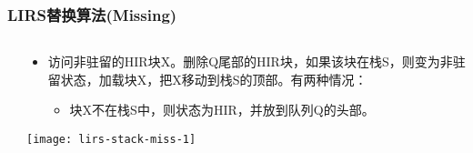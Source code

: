 \begin{frame}[plain]
	\frametitle{LIRS替换算法(Missing)}
	\begin{columns}
		\begin{column}{.1\textwidth}
			\centering
			
			
		\end{column}
		
		\begin{column}{.9\textwidth}
			
			\begin{itemize}
				
				\item 访问非驻留的HIR块X。删除Q尾部的HIR块，如果该块在栈S，则变为非驻留状态，加载块X，把X移动到栈S的顶部。有两种情况：
				\begin{itemize}
					\item 块X不在栈S中，则状态为HIR，并放到队列Q的头部。
				
				
			\end{itemize}
			\end{itemize}
			\centering
			\texttt{[image: lirs-stack-miss-1]}
			
		\end{column}
		
		
	\end{columns}
\end{frame}



